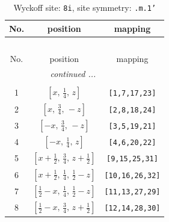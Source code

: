 \documentclass[fleqn,8pt]{jsarticle}
\begin{document}
\begin{longtable}{ccc}
\caption{Wyckoff site: {\tt 8i}, site symmetry: {\tt .m.1'}}
 \\
 \hline \hline
No. & position & mapping \\ \hline \endfirsthead

\multicolumn{2}{l}{\tablename\ \thetable{}} \\
 \hline \hline
No. & position & mapping \\ \hline \endhead

 \hline \hline
\multicolumn{2}{r}{\footnotesize\it continued ...} \\ \endfoot

 \hline \hline
\multicolumn{2}{r}{} \\ \endlastfoot

1 & $\left[ x,\, \frac{1}{4},\, z \right]$ & {\tt [1,7,17,23]} \\ \hline
2 & $\left[ x,\, \frac{3}{4},\, - z \right]$ & {\tt [2,8,18,24]} \\ \hline
3 & $\left[ - x,\, \frac{3}{4},\, - z \right]$ & {\tt [3,5,19,21]} \\ \hline
4 & $\left[ - x,\, \frac{1}{4},\, z \right]$ & {\tt [4,6,20,22]} \\ \hline
5 & $\left[ x + \frac{1}{2},\, \frac{3}{4},\, z + \frac{1}{2} \right]$ & {\tt [9,15,25,31]} \\ \hline
6 & $\left[ x + \frac{1}{2},\, \frac{1}{4},\, \frac{1}{2} - z \right]$ & {\tt [10,16,26,32]} \\ \hline
7 & $\left[ \frac{1}{2} - x,\, \frac{1}{4},\, \frac{1}{2} - z \right]$ & {\tt [11,13,27,29]} \\ \hline
8 & $\left[ \frac{1}{2} - x,\, \frac{3}{4},\, z + \frac{1}{2} \right]$ & {\tt [12,14,28,30]} \\
\end{longtable}
\renewcommand{\arraystretch}{1.2}
\end{document}
